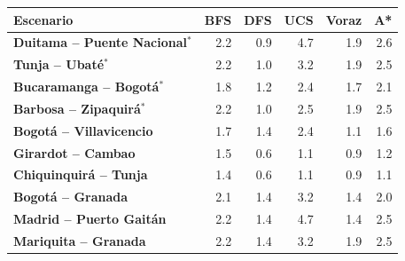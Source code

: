 \renewcommand{\arraystretch}{1.2}
\begin{tabular}{|l|r|r|r|r|r|}
\hline
\rowcolor{gray!20} \textbf{Escenario} & \textbf{BFS} & \textbf{DFS} & \textbf{UCS} & \textbf{Voraz} & \textbf{A*} \\
\hline
\textbf{Duitama -- Puente Nacional$^{*}$} & 2.2 & 0.9 & 4.7 & 1.9 & 2.6 \\
\hline
\textbf{Tunja -- Ubaté$^{*}$} & 2.2 & 1.0 & 3.2 & 1.9 & 2.5 \\
\hline
\textbf{Bucaramanga -- Bogotá$^{*}$} & 1.8 & 1.2 & 2.4 & 1.7 & 2.1 \\
\hline
\textbf{Barbosa -- Zipaquirá$^{*}$} & 2.2 & 1.0 & 2.5 & 1.9 & 2.5 \\
\hline
\textbf{Bogotá -- Villavicencio} & 1.7 & 1.4 & 2.4 & 1.1 & 1.6 \\
\hline
\textbf{Girardot -- Cambao} & 1.5 & 0.6 & 1.1 & 0.9 & 1.2 \\
\hline
\textbf{Chiquinquirá -- Tunja} & 1.4 & 0.6 & 1.1 & 0.9 & 1.1 \\
\hline
\textbf{Bogotá -- Granada} & 2.1 & 1.4 & 3.2 & 1.4 & 2.0 \\
\hline
\textbf{Madrid -- Puerto Gaitán} & 2.2 & 1.4 & 4.7 & 1.4 & 2.5 \\
\hline
\textbf{Mariquita -- Granada} & 2.2 & 1.4 & 3.2 & 1.9 & 2.5 \\
\hline
\end{tabular}
